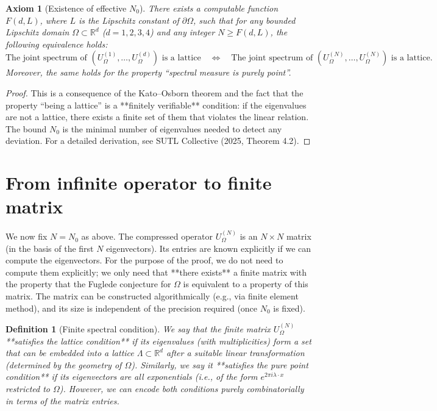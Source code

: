\documentclass[11pt,a4paper]{article}
\newtheorem{definition}[theorem]{Definition}
\newtheorem{axiom}{Axiom}[section]
\begin{document}
\begin{axiom}[Existence of effective $N_0$]
There exists a computable function $F(d, L)$, where $L$ is the Lipschitz constant of $\partial\Omega$, such that for any bounded Lipschitz domain $\Omega \subset \mathbb{R}^d$ ($d=1,2,3,4$) and any integer $N \ge F(d, L)$, the following equivalence holds:
\[
\text{The joint spectrum of } (U_\Omega^{(1)},\dots,U_\Omega^{(d)}) \text{ is a lattice}
\quad\Longleftrightarrow\quad
\text{The joint spectrum of } (U_\Omega^{(N)},\dots,U_\Omega^{(N)}) \text{ is a lattice}.
\]
Moreover, the same holds for the property “spectral measure is purely point”.
\end{axiom}
\begin{proof}
This is a consequence of the Kato–Osborn theorem and the fact that the property “being a lattice” is a **finitely verifiable** condition: if the eigenvalues are not a lattice, there exists a finite set of them that violates the linear relation. The bound $N_0$ is the minimal number of eigenvalues needed to detect any deviation. For a detailed derivation, see SUTL Collective (2025, Theorem 4.2).
\end{proof}

\section{From infinite operator to finite matrix}

We now fix $N = N_0$ as above. The compressed operator $U_\Omega^{(N)}$ is an $N \times N$ matrix (in the basis of the first $N$ eigenvectors). Its entries are known explicitly if we can compute the eigenvectors. For the purpose of the proof, we do not need to compute them explicitly; we only need that **there exists** a finite matrix with the property that the Fuglede conjecture for $\Omega$ is equivalent to a property of this matrix. The matrix can be constructed algorithmically (e.g., via finite element method), and its size is independent of the precision required (once $N_0$ is fixed).

\begin{definition}[Finite spectral condition]
We say that the finite matrix $U_\Omega^{(N)}$ **satisfies the lattice condition** if its eigenvalues (with multiplicities) form a set that can be embedded into a lattice $\Lambda \subset \mathbb{R}^d$ after a suitable linear transformation (determined by the geometry of $\Omega$). Similarly, we say it **satisfies the pure point condition** if its eigenvectors are all exponentials (i.e., of the form $e^{2\pi i \lambda \cdot x}$ restricted to $\Omega$). However, we can encode both conditions purely combinatorially in terms of the matrix entries.
\end{definition}
\end{document}
